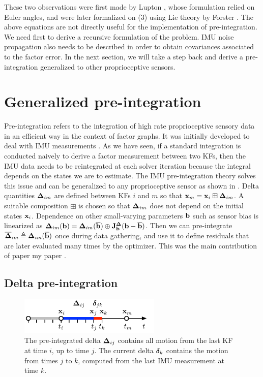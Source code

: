 These two observations were first made by Lupton \cite{lupton-09}, whose formulation relied on Euler angles, and were later formalized on \SO(3) using Lie theory
by Forster \cite{forster2017-TRO}. The above equations are not directly useful for the implementation of pre-integration. We need first to derive a recursive formulation 
of the problem. IMU noise propagation also needs to be described in order to obtain covariances associated to the factor error. In the next section, we will take 
a step back and derive a pre-integration generalized to other proprioceptive sensors.



\section{Generalized pre-integration}
\label{sec:general-preint}


Pre-integration refers to the integration of high rate proprioceptive sensory data in an efficient way in the context of factor graphs. 
It was initially developed to deal with IMU measurements \cite{lupton-09, forster2017-TRO}. 
As we have seen, if a standard integration is conducted naively to derive a factor measurement between two KFs, 
then the IMU data needs to be reintegrated at each solver iteration because the integral depends on the states we are to estimate. 
The IMU pre-integration theory solves this issue and can be generalized to any proprioceptive sensor as shown in \cite{atchuthan-18-thesis,deray-19-selfcalib,fourmy2021contact}. 
Delta quantities ${\bm \Delta}_{im}$  are defined between KFs $i$ and $m$ so that ${\bf x}_m={\bf x}_i\boxplus{\bm \Delta}_{im}$. A suitable composition $\boxplus$ is chosen so that ${\bm \Delta}_{im}$ 
does not depend on the initial states ${\bf x}_i$. 
Dependence on other small-varying parameters ${\bf b}$ such as sensor bias is linearized as ${\bm \Delta}_{im}({\bf b})={\bm \Delta}_{im}(\overline{{\bf b}})\oplus{\bf J}^{\bm \Delta}_{\bf b}({\bf b}-\overline{{\bf b}})$.
Then we can pre-integrate $\overline{{\bm \Delta}}_{im}\triangleq{\bm \Delta}_{im}(\overline{{\bf b}})$ once during data gathering, and use it to define residuals that are later evaluated many times by the optimizer.
This was the main contribution of paper my paper \cite{fourmy2021contact}.




\subsection{Delta pre-integration}

\begin{figure}[tb]
    \centering
    \includegraphics[width=0.6\textwidth]{figures/delta_time}
    \caption{
    The pre-integrated delta ${\bm \Delta}_{ij}$ contains all motion from the last KF at time $i$, up to time $j$. 
    The current delta ${\bm \delta}_k$ contains the motion from times $j$ to $k$, computed from the last IMU measurement at time $k$.}
    \label{fig:delta_time}
\end{figure}

